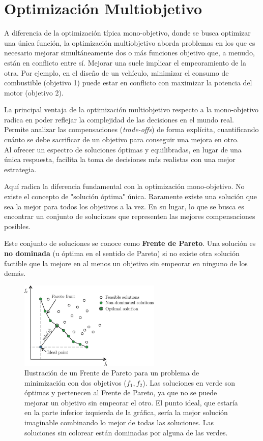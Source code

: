 \documentclass[12pt,a4paper]{book}
\begin{document}
\section{Optimización Multiobjetivo}
A diferencia de la optimización típica mono-objetivo, donde se busca optimizar una única función, la optimización multiobjetivo aborda problemas en los que es necesario mejorar simultáneamente dos o más funciones objetivo que, a menudo, están en conflicto entre sí. Mejorar una suele implicar el empeoramiento de la otra. Por ejemplo, en el diseño de un vehículo, minimizar el consumo de combustible (objetivo 1) puede estar en conflicto con maximizar la potencia del motor (objetivo 2).

La principal ventaja de la optimización multiobjetivo respecto a la mono-objetivo radica en poder reflejar la complejidad de las decisiones en el mundo real.
Permite analizar las compensaciones (\textit{trade-offs}) de forma explícita, cuantificando cuánto se debe sacrificar de un objetivo para conseguir una mejora en otro.\\
Al ofrecer un espectro de soluciones óptimas y equilibradas, en lugar de una única respuesta, facilita la toma de decisiones más realistas con una mejor estrategia.

Aquí radica la diferencia fundamental con la optimización mono-objetivo. No existe el concepto de "solución óptima" única. Raramente existe una solución que sea la mejor para todos los objetivos a la vez. En su lugar, lo que se busca es encontrar un conjunto de soluciones que representen las mejores compensaciones posibles.

Este conjunto de soluciones se conoce como \textbf{Frente de Pareto}. 
Una solución es \textbf{no dominada} (u óptima en el sentido de Pareto) si no existe otra solución factible que la mejore en al menos un objetivo sin empeorar en ninguno de los demás.

\begin{figure}[H]
    \centering
    \includegraphics[width=0.6\textwidth]{images/pareto_front.png}
    \caption{Ilustración de un Frente de Pareto para un problema de minimización con dos objetivos ($f_1, f_2$). Las soluciones en verde son óptimas y pertenecen al Frente de Pareto, ya que no se puede mejorar un objetivo sin empeorar el otro. El punto ideal, que estaría en la parte inferior izquierda de la gráfica, sería la mejor solución imaginable combinando lo mejor de todas las soluciones. Las soluciones sin colorear están dominadas por alguna de las verdes\cite{Bre2017}.}
    \label{fig:pareto}
\end{figure}
\end{document}
